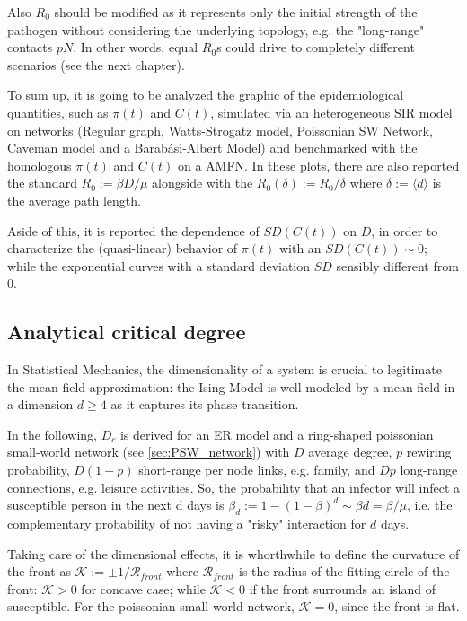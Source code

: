 \documentclass[a4paper,10pt,twoside]{book} %
\theoremstyle{definition}
\begin{document}
Also $R_0$ should be modified as it represents only the initial strength of the pathogen without considering the underlying topology, e.g. the "long-range" contacts $pN$. In other words, equal $R_0$s could drive to completely different scenarios (see the next chapter).

To sum up, it is going to be analyzed the graphic of the epidemiological quantities, such as $\pi(t)$ and $C(t)$, simulated via an heterogeneous SIR model on networks (Regular graph, Watts-Strogatz model, Poissonian SW Network, Caveman model and a Barabási-Albert Model) and benchmarked with the homologous $\pi(t)$ and $C(t)$ on a AMFN. In these plots, there are also reported the standard $R_0 := \beta D / \mu$ alongside with the $R_0(\delta) := R_0 /\delta$ where $\delta:=\langle d \rangle $ is the average path length.

Aside of this, it is reported the dependence of $SD(C(t))$ on $D$, in order to characterize the (quasi-linear) behavior of $\pi(t)$ with an $SD(C(t)) \sim 0$; while the exponential curves with a standard deviation $SD$ sensibly different from $0$.

\subsection*{Analytical critical degree}
In Statistical Mechanics, the dimensionality of a system is crucial to legitimate the mean-field approximation: the Ising Model is well modeled by a mean-field in a dimension $d \geq 4$ as it captures its phase transition.

In the following, $D_c$ is derived for an ER model and a ring-shaped poissonian small-world network (see \autoref{sec:PSW_network}) with $D$ average degree, $p$ rewiring probability, $D(1-p)$ short-range per node links, e.g. family, and $Dp$ long-range connections, e.g. leisure activities. So, the probability that an infector will infect a susceptible person in the next d days is $\beta_d:= 1-(1-\beta)^d \sim \beta d = \beta/\mu$, i.e. the complementary probability of not having a "risky" interaction for $d$ days.

Taking care of the dimensional effects, it is whorthwhile to define the curvature of the front as $ \mathcal{K}:= \pm 1/\mathcal{R}_{front}$ where $\mathcal{R}_{front}$ is the radius of the fitting circle of the front: $\mathcal{K}>0$ for concave case; while $\mathcal{K}<0$ if the front surrounds an island of susceptible. For the poissonian small-world network, $\mathcal{K} = 0$, since the front is flat.    
\end{document}
